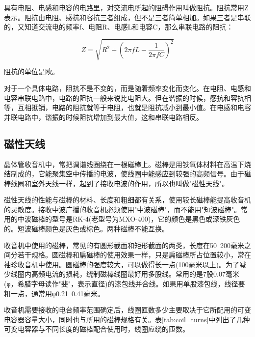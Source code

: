 \documentclass[12pt,UTF8]{ctexbook}
\begin{document}
具有电阻、电感和电容的电路里，对交流电所起的阻碍作用叫做阻抗。阻抗常用Z表示。阻抗由电阻、感抗和容抗三者组成，但不是三者简单相加。如果三者是串联的，又知道交流电的频率f、电阻R、电感L和电容C，那么串联电路的阻抗：

\[ Z = \sqrt{R^2 + (2\pi f L - \frac{1}{2\pi f C})^2} \]

阻抗的单位是欧。

对于一个具体电路，阻抗不是不变的，而是随着频率变化而变化。在电阻、电感和电容串联电路中，电路的阻抗一般来说比电阻大。但在谐振的时候，感抗和容抗相等，互相抵销，电路的阻抗就等于电阻，也就是阻抗减小到最小值。在电感和电容并联电路中，谐振的时候阻抗增加到最大值，这和串联电路相反。

\subsection{磁性天线}

晶体管收音机中，常把调谐线圈绕在一根磁棒上。磁棒是用铁氧体材料在高温下烧结制成的，它能聚集空中传播的电波，使线圈中能感应到较强的高频信号。由于磁棒线圈和室外天线一样，起到了接收电波的作用，所以也叫做"磁性天线"。

磁性天线的性能与磁棒的材料、长度和粗细都有关系，使用较长磁棒能提高收音机的灵敏度。接收中波广播的收音机必须使用"中波磁棒"，而不能用"短波磁棒"。常用的中波磁棒的型号是RK-4(老型号为MXO-400)，它的颜色是黑色或深铁灰色的。短波磁棒颜色是灰色或棕色。两种磁棒不能互换。

收音机中使用的磁棒，常见的有圆形截面和矩形截面的两类，长度在50~200毫米之间分若干规格。圆磁棒和扁磁棒的使用效果一样，只是扁磁棒所占位置较小，常在袖珍收音机中使用。圆磁棒的强度较大，可以做得长一点(100毫米以上)。为了减少线圈内高频电流的损耗，绕制磁棒线圈最好用多股线。常用的是7股0.07毫米(φ，希腊字母读作"斐"，表示直径)的漆包线并合线。如果用单股漆包线，线径要粗一点，通常用φ0.21~0.41毫米。

收音机需要接收的电台频率范围确定后，线圈匝数多少主要取决于它所配用的可变电容器容量大小，同时也与所用的磁棒规格有关。表\ref{tab:coil_turns}中列出了几种可变电容器与不同长度的磁棒配合使用时，线圈应绕的匝数。
\end{document}
